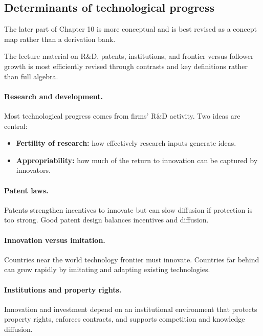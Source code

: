 \documentclass[12pt]{article}
\begin{document}
\subsection{Determinants of technological progress}

The later part of Chapter 10 is more conceptual and is best revised as a concept map rather than a derivation bank.

\begin{examtip}[title={Exam Focus: Likely MCQ-only}]
The lecture material on R\&D, patents, institutions, and frontier versus follower growth is most efficiently revised through contrasts and key definitions rather than full algebra.
\end{examtip}

\paragraph{Research and development.}
Most technological progress comes from firms' R\&D activity. Two ideas are central:
\begin{itemize}[leftmargin=1.5em]
\item \textbf{Fertility of research:} how effectively research inputs generate ideas.
\item \textbf{Appropriability:} how much of the return to innovation can be captured by innovators.
\end{itemize}

\paragraph{Patent laws.}
Patents strengthen incentives to innovate but can slow diffusion if protection is too strong. Good patent design balances incentives and diffusion.

\paragraph{Innovation versus imitation.}
Countries near the world technology frontier must innovate. Countries far behind can grow rapidly by imitating and adapting existing technologies.

\paragraph{Institutions and property rights.}
Innovation and investment depend on an institutional environment that protects property rights, enforces contracts, and supports competition and knowledge diffusion.
\end{document}
